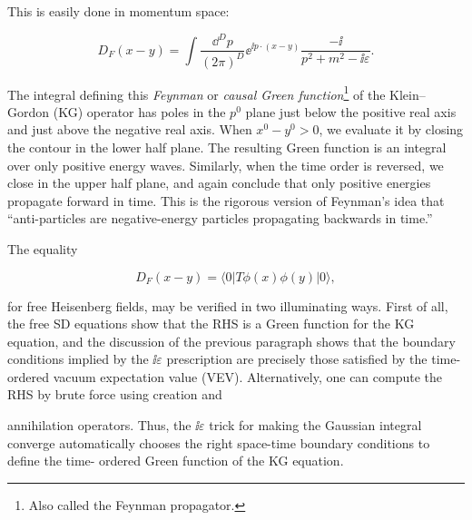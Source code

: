 This is easily done in momentum space:

\begin{equation}
D_F(x-y)=\int\frac{\dd^D p}{(2\pi)^D}\ee^{\ii p\mathbin{\cdot}(x-y)}\frac{-\ii}{p^2+m^2-\ii\varepsilon}.
\label{eq:3.19}
\end{equation}

The integral defining this \emph{Feynman} or \emph{causal Green function}\footnote[3]{Also called the Feynman propagator.} of the Klein--Gordon
(KG) operator has poles in the $p^0$ plane just below the positive real axis and just above
the negative real axis. When $x^0-y^0>0$, we evaluate it by closing the contour in the
lower half plane. The resulting Green function is an integral over only positive energy
waves. Similarly, when the time order is reversed, we close in the upper half plane,
and again conclude that only positive energies propagate forward in time. This is the
rigorous version of Feynman's idea that ``anti-particles are negative-energy particles
propagating backwards in time.''

The equality

\begin{equation}
D_F(x-y)=\langle0|T\phi(x)\phi(y)|0\rangle,
\label{eq:3.20}
\end{equation}

for free Heisenberg fields, may be verified in two illuminating ways. First of all, the free
SD equations show that the RHS is a Green function for the KG equation, and the
discussion of the previous paragraph shows that the boundary conditions implied by
the $\ii\varepsilon$ prescription are precisely those satisfied by the time-ordered vacuum expectation
value (VEV). Alternatively, one can compute the RHS by brute force using creation and

annihilation operators. Thus, the $\ii\varepsilon$ trick for making the Gaussian integral converge
automatically chooses the right space-time boundary conditions to define the time-
ordered Green function of the KG equation.

